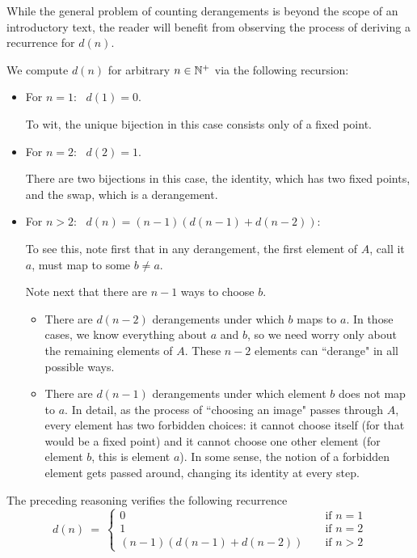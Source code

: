 \smallskip

While the general problem of counting derangements is beyond the scope of an introductory text, the reader will benefit from observing the process of deriving a recurrence for $d(n)$.  

\medskip

We compute $d(n)$ for arbitrary $n \in \mathbb{N}^+$ via the following recursion:
\begin{itemize}
\item
For $n=1$:  \ $d(1) = 0$.

\smallskip

To wit, the unique bijection in this case consists only of a fixed point. 

\item
For $n=2$:  \ $d(2) = 1$.

\smallskip

There are two bijections in this case, the identity, which has two fixed points, and the swap,
which is a derangement.

\item
For $n > 2$: \ $d(n) = (n-1) (d(n-1) + d(n-2))$:

\smallskip

To see this, note first that in any derangement, the first element of $A$, call it $a$, must map to some $b \neq a$.

\smallskip

Note next that there are $n-1$ ways to choose $b$.
  \begin{itemize}
  \item
There are $d(n-2)$ derangements under which $b$ maps to $a$.  In those cases, we know everything about $a$ and $b$, so we need worry only about the remaining elements of $A$.  These $n-2$ elements can ``derange" in all possible ways.

  \item
There are $d(n-1)$ derangements under which element $b$ does not map to $a$.  In detail,
as the process of ``choosing an image" passes through $A$, every element has two forbidden
choices: it cannot choose itself (for that would be a fixed point) and it cannot choose one other
element (for element $b$, this is element $a$).  In some sense, the notion of a forbidden element gets passed around, changing its identity at every step.
  \end{itemize}
\end{itemize}
The preceding reasoning verifies the following recurrence
\[
d(n) \ = \ \left\{
\begin{array}{ccl}
0 &  & \mbox{ if } n=1 \\
1 &  & \mbox{ if } n= 2 \\
(n-1) (d(n-1) + d(n-2)) &  & \mbox{ if } n> 2
\end{array}
\right. 
\]

